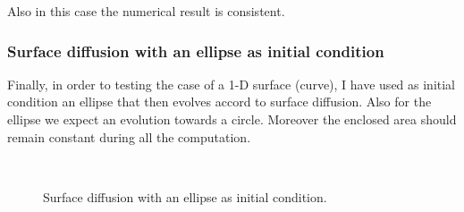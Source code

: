 \documentclass[a4paper,11pt, onecolumn]{article}
\begin{document}
\noindent Also in this case the numerical result is consistent.

\subsubsection{Surface diffusion with an ellipse as initial condition}\label{subsubsec:sd_ellipse}

Finally, in order to testing the case of a 1-D surface (curve), I have used as initial condition an ellipse that then evolves accord to surface diffusion. Also for the ellipse we expect an evolution towards a circle. Moreover the enclosed area should remain constant during all the computation.

\begin{figure}[htbp]
  \centering
  \quad
  \\
  \quad
  \caption{Surface diffusion with an ellipse as initial condition.}
  \label{fig:sd_ellipse}
\end{figure}
\end{document}
